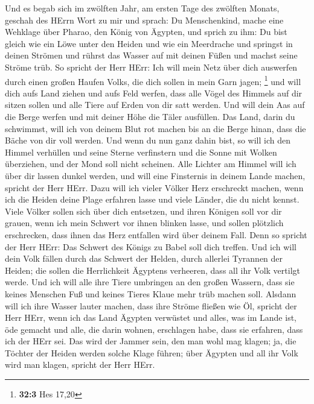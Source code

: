  Und es begab sich im zwölften Jahr, am ersten Tage des
zwölften Monats, geschah des HErrn Wort zu mir und sprach:
 Du Menschenkind, mache eine Wehklage über Pharao, den
König von Ägypten, und sprich zu ihm: Du bist gleich wie ein Löwe unter
den Heiden und wie ein Meerdrache und springst in deinen Strömen und
rührst das Wasser auf mit deinen Füßen und machst seine Ströme trüb.
 So spricht der Herr HErr: Ich will mein Netz über dich
auswerfen durch einen großen Haufen Volks, die dich sollen in mein Garn
jagen; \footnote{\textbf{32:3} Hes 17,20}  und will dich
aufs Land ziehen und aufs Feld werfen, dass alle Vögel des Himmels auf
dir sitzen sollen und alle Tiere auf Erden von dir satt werden.
 Und will dein Aas auf die Berge werfen und mit deiner
Höhe die Täler ausfüllen.  Das Land, darin du schwimmst,
will ich von deinem Blut rot machen bis an die Berge hinan, dass die
Bäche von dir voll werden.  Und wenn du nun ganz dahin
bist, so will ich den Himmel verhüllen und seine Sterne verfinstern und
die Sonne mit Wolken überziehen, und der Mond soll nicht scheinen.
 Alle Lichter am Himmel will ich über dir lassen dunkel
werden, und will eine Finsternis in deinem Lande machen, spricht der
Herr HErr.  Dazu will ich vieler Völker Herz erschreckt
machen, wenn ich die Heiden deine Plage erfahren lasse und viele Länder,
die du nicht kennst.  Viele Völker sollen sich über dich
entsetzen, und ihren Königen soll vor dir grauen, wenn ich mein Schwert
vor ihnen blinken lasse, und sollen plötzlich erschrecken, dass ihnen
das Herz entfallen wird über deinem Fall.  Denn so
spricht der Herr HErr: Das Schwert des Königs zu Babel soll dich
treffen.  Und ich will dein Volk fällen durch das Schwert
der Helden, durch allerlei Tyrannen der Heiden; die sollen die
Herrlichkeit Ägyptens verheeren, dass all ihr Volk vertilgt werde.
 Und ich will alle ihre Tiere umbringen an den großen
Wassern, dass sie keines Menschen Fuß und keines Tieres Klaue mehr trüb
machen soll.  Alsdann will ich ihre Wasser lauter machen,
dass ihre Ströme fließen wie Öl, spricht der Herr HErr, 
wenn ich das Land Ägypten verwüstet und alles, was im Lande ist, öde
gemacht und alle, die darin wohnen, erschlagen habe, dass sie erfahren,
dass ich der HErr sei.  Das wird der Jammer sein, den man
wohl mag klagen; ja, die Töchter der Heiden werden solche Klage führen;
über Ägypten und all ihr Volk wird man klagen, spricht der Herr HErr.
